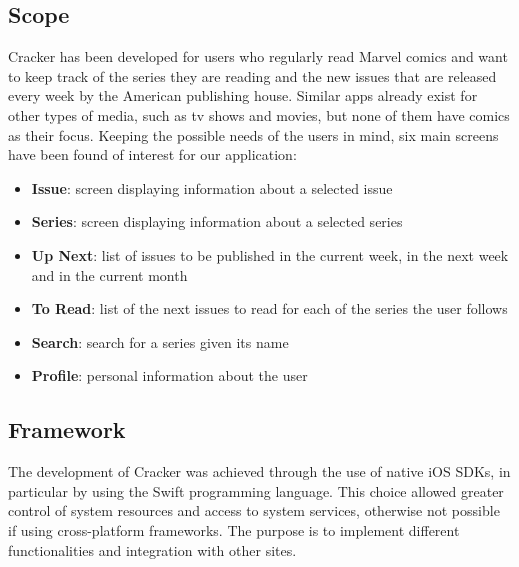 \subsection{Scope}
Cracker has been developed for users who regularly read Marvel comics and want to keep track of the series they are reading and the new issues that are released every week by the American publishing house. Similar apps already exist for other types of media, such as tv shows and movies, but none of them have comics as their focus. Keeping the possible needs of the users in mind, six main screens have been found of interest for our application:
\begin{itemize}
\item {\textbf{Issue}}: screen displaying information about a selected issue
\item {\textbf{Series}}: screen displaying information about a selected series
\item {\textbf{Up Next}}: list of issues to be published in the current week, in the next week and in the current month
\item {\textbf{To Read}}: list of the next issues to read for each of the series the user follows
\item {\textbf{Search}}: search for a series given its name
\item {\textbf{Profile}}: personal information about the user
\end{itemize}


\subsection{Framework}
The development of Cracker was achieved through the use of native iOS SDKs, in particular by using the Swift programming language. This choice allowed greater control of system resources and access to system services, otherwise not possible if using cross-platform frameworks. The purpose is to implement different functionalities and integration with other sites.


